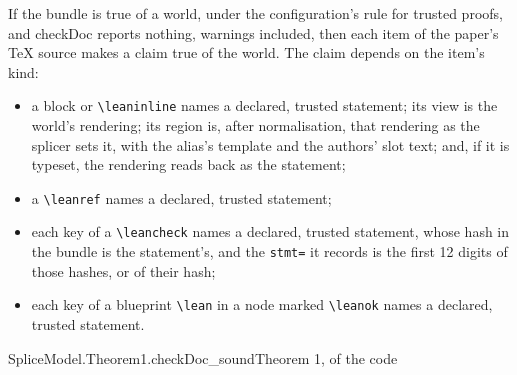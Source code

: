 \documentclass[acmsmall,screen,review,anonymous,nonacm]{acmart}
\begin{document}
If the bundle is true of a world, under the
configuration's rule for trusted proofs, and \textsf{checkDoc} reports
nothing, warnings included, then each item of the paper's \TeX{} source
makes a claim true of the world.
The claim depends on the item's kind:
\begin{itemize}
\item a block or \verb|\leaninline| names a declared, trusted statement;
  its view is the world's rendering; its region is, after normalisation,
  that rendering as the splicer sets it, with the alias's template and the
  authors' slot text; and, if it is typeset, the rendering reads back as
  the statement;
\item a \verb|\leanref| names a declared, trusted statement;
\item each key of a \verb|\leancheck| names a declared, trusted statement,
  whose hash in the bundle is the statement's, and the \verb|stmt=| it
  records is the first 12 digits of those hashes, or of their hash;
\item each key of a blueprint \verb|\lean| in a node marked
  \verb|\leanok| names a declared, trusted statement.
\end{itemize}

\begin{leansource}[sum=vgxZAbKGRE]{SpliceModel.Theorem1.checkDoc_sound}{Theorem 1, of the code}
\end{leansource}
\end{document}
